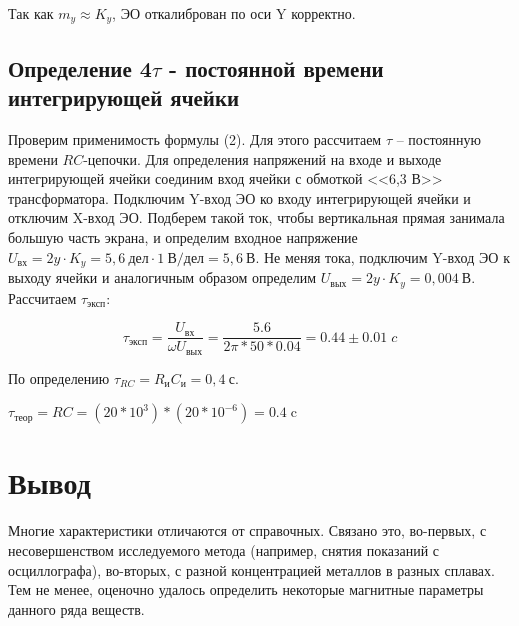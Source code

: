\documentclass[a4paper,11pt]{extarticle} %
\begin{document}
Так как $m_y \approx K_y$, ЭО откалиброван по оси Y корректно.


\subsection{Определение 4$\tau$ - постоянной времени интегрирующей ячейки}
Проверим применимость формулы (2). Для этого рассчитаем $\tau$ -- постоянную времени $ RC $-цепочки. 
Для определения напряжений на входе и выходе интегрирующей ячейки соединим вход ячейки с обмоткой <<6,3 В>> трансформатора.
Подключим Y-вход ЭО ко входу интегрирующей ячейки и отключим X-вход ЭО. Подберем такой ток, чтобы вертикальная прямая занимала большую часть экрана,
и определим входное напряжение $U_{\text{вх}}=2y\cdot K_y=5,6\ \text{дел} \cdot 1\ \text{В/дел}=5,6\ \text{В}$. 
Не меняя тока, подключим Y-вход ЭО к выходу ячейки и аналогичным образом определим $U_{\text{вых}}=2y\cdot K_y=0,004\ \text{В}$. Рассчитаем $\tau_{\text{эксп}}:$


\begin{equation*}
	\tau_{\text{эксп}} = \frac{U_{\text{вх}}}{\omega U_{\text{вых}}} = \frac{5.6}{2 \pi * 50 * 0.04} = 0.44\pm 0.01 \; c
\end{equation*}


По определению $\tau_{RC}=R_\text{и}C_\text{и}=0,4\ \text{с}$.

$\tau_{\text{теор}} = R C = (20*10^3)*(20*10^{-6}) = 0.4\; \text{c}$




\section{Вывод}

Многие характеристики отличаются от справочных. Связано это, во-первых, с несовершенством исследуемого метода (например, снятия показаний с осциллографа), во-вторых, 
с разной концентрацией металлов в разных сплавах. Тем не менее, оценочно удалось определить некоторые магнитные параметры данного ряда веществ.
\end{document}
